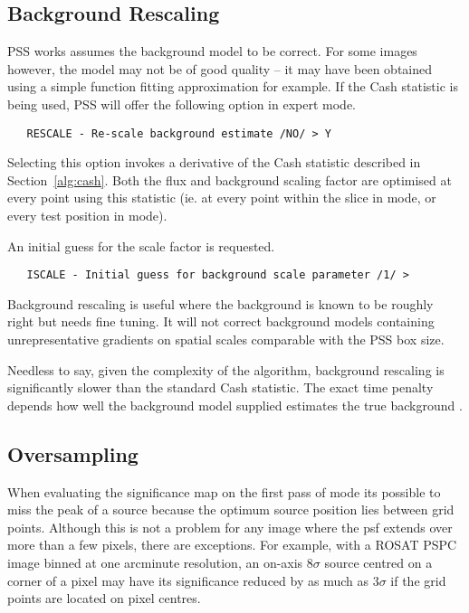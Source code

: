 \subsection{Background Rescaling}

PSS works assumes the background model to be correct. For some images
however, the model may not be of good quality -- it may have been obtained
using a simple function fitting approximation for example. If the Cash
statistic is being used, PSS will offer the following option in expert
mode.
\begin{verbatim}
   RESCALE - Re-scale background estimate /NO/ > Y
\end{verbatim}
Selecting this option invokes a derivative of the Cash statistic described
in Section~\ref{alg:cash}. Both the flux and background scaling factor 
are optimised
at every point using this statistic (ie. at every point within the slice
in  mode, or every test position in  mode).

An initial guess for the scale factor is requested.
\begin{verbatim}
   ISCALE - Initial guess for background scale parameter /1/ >
\end{verbatim}
Background rescaling is useful where the background is known to be roughly
right but needs fine tuning. It will not correct background models containing
unrepresentative gradients on spatial scales comparable with the PSS box size.

Needless to say, given the complexity of the algorithm, background rescaling
is significantly slower than the standard Cash statistic. The exact time
penalty depends how well the background model supplied estimates the true
background .

\subsection{Oversampling}

When evaluating the significance map on the first pass of 
mode its possible to miss the peak of a source because the optimum source
position lies between grid points. Although this is not a problem for any
image where the psf extends over more than a few pixels, there are
exceptions. For example, with a ROSAT PSPC image binned at one arcminute
resolution, an on-axis $8\sigma$ source centred on a corner of a pixel 
may have its significance reduced by as much as $3\sigma$ if the grid 
points are located on pixel centres.

